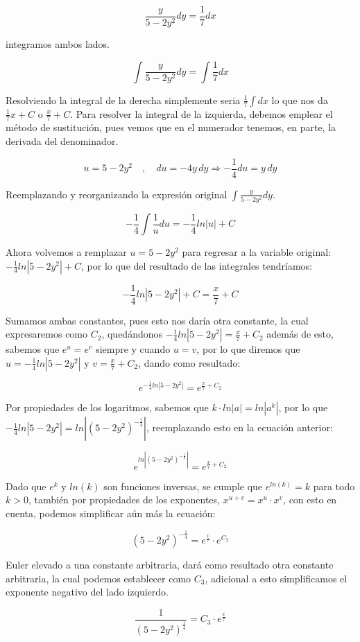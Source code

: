 \documentclass{article}
\begin{document}
\[
 \frac{y}{5-2y^2}dy=\frac{1}{7}dx
\]

integramos ambos lados.

\[
 \int\frac{y}{5-2y^2}dy=\int\frac{1}{7}dx
\]

Resolviendo la integral de la derecha simplemente seria \(\frac{1}{7}\int dx\) lo que nos da \(\frac{1}{7}x+C\) o \(\frac{x}{7}+C\). Para resolver la integral de la izquierda, debemos emplear el método de sustitución, pues vemos que en el numerador tenemos, en parte, la derivada del denominador.

\[
 u=5-2y^2\quad,\quad du=-4y\,dy\Rightarrow-\frac{1}{4}du=y\,dy
\]

Reemplazando y reorganizando la expresión original \(\int\frac{y}{5-2y^2}dy\).

\[
 -\frac{1}{4}\int \frac{1}{u}du=-\frac{1}{4}ln|u|+C 
\]

Ahora volvemos a remplazar  \(u=5-2y^2\) para regresar a la variable original: \(-\frac{1}{4}ln|5-2y^2|+C\), por lo que del resultado de las integrales tendríamos: 

\[
 -\frac{1}{4}ln|5-2y^2|+C=\frac{x}{7}+C
\]

Sumamos ambas constantes, pues esto nos daría otra constante, la cual expresaremos como \(C_2\), quedándonos \(-\frac{1}{4}ln|5-2y^2|=\frac{x}{7}+C_2\) además de esto, sabemos que \(e^u=e^v\) siempre y cuando \(u=v\), por lo que diremos que \(u=-\frac{1}{4}ln|5-2y^2|\) y \(v=\frac{x}{7}+C_2\), dando como resultado: 

\[
 e^{-\frac{1}{4}ln|5-2y^2|}=e^{\frac{x}{7}+C_2}
\]

Por propiedades de los logaritmos, sabemos que \(k\cdot ln|a|=ln|a^k|\), por lo que \(-\frac{1}{4}ln|5-2y^2|=ln|(5-2y^2)^{-\frac{1}{4}}|\), reemplazando esto en la ecuación anterior: 

\[
 e^{ln|(5-2y^2)^{-\frac{1}{4}}|}=e^{\frac{x}{7}+C_2}
\]

Dado que \(e^k\) y \(ln(k)\) son funciones inversas, se cumple que \(e^{ln(k)}=k\) para todo \(k>0\), también por propiedades de los exponentes, \(x^{u+v}=x^u\cdot x^v\), con esto en cuenta, podemos simplificar aún más la ecuación:

\[
 (5-2y^2)^{-\frac{1}{4}}=e^{\frac{x}{7}}\cdot e^{C_2}
\]

Euler elevado a una constante arbitraria, dará como resultado otra constante arbitraria, la cual podemos establecer como \(C_3\), adicional a esto simplificamos el exponente negativo del lado izquierdo.

\[
 \frac{1}{(5-2y^2)^{\frac{1}{4}}}=C_3\cdot e^{\frac{x}{7}}
\]
\end{document}
